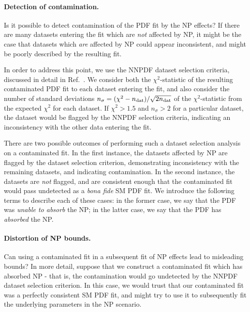 \documentclass[withindex,glossary]{cam-thesis}
\begin{document}
\paragraph{Detection of contamination.} Is it possible to detect contamination of the PDF fit by the NP effects? If there are many datasets entering the fit which are \textit{not} affected by NP, it might be the case that datasets which \textit{are} affected by NP could appear inconsistent, and might be poorly described by the resulting fit.

In order to address this point, we use the NNPDF dataset selection criteria, discussed in detail in Ref.~\cite{Ball:2021leu}. We consider both the $\chi^2$-statistic of the resulting contaminated PDF fit to each dataset entering the fit, and also consider the number of standard deviations $n_{\sigma} = (\chi^2 - n_{\rm dat}) / \sqrt{2n_{\rm dat}}$ of the $\chi^2$-statistic from the expected $\chi^2$ for each dataset. If $\chi^2 > 1.5$ and $n_{\sigma} > 2$ for a particular dataset, the dataset would be flagged by the NNPDF selection criteria, indicating an inconsistency with the other data entering the fit.

There are two possible outcomes of performing such a dataset selection analysis on a contaminated fit. In the first instance, the datasets affected by NP are flagged by the dataset selection criterion, demonstrating inconsistency with the remaining datasets, and indicating contamination. In the second instance, the datasets are \textit{not} flagged, and are consistent enough that the contaminated fit would pass undetected as a \textit{bona fide} SM PDF fit. We introduce the following terms to describe each of these cases: in the former case, we say that the PDF was \textit{unable to absorb} the NP; in the latter case, we say that the PDF has \textit{absorbed} the NP.

\paragraph{Distortion of NP bounds.} Can using a contaminated fit in a subsequent fit of NP effects lead to misleading bounds? In more detail, suppose that we construct a contaminated fit which has absorbed NP - that is, the contamination would go undetected by the NNPDF dataset selection criterion. In this case, we would trust that our contaminated fit was a perfectly consistent SM PDF fit, and might try to use it to subsequently fit the underlying parameters in the NP scenario. 
\end{document}

